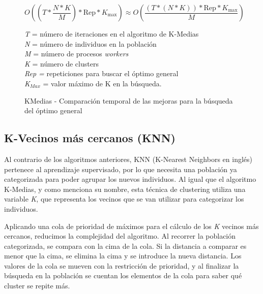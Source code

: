 		\begin{figure} [!h]
			\begin{mdframed}[roundcorner=5pt]
				\[
				O\left((T * \frac{N * K}{M}) * \text{Rep} * K_{\text{max}}\right) \approx O\left(\frac{{(T * (N * K)) * \text{Rep} * K_{\text{max}}}}{{M}}\right)
				\]
				
				
				
				\begin{tcolorbox}[boxrule=0.5pt, fontupper=\small]
					
					\textit{T} = número de iteraciones en el algoritmo de K-Medias\\
					\textit{N} = número de individuos en la población\\
					\textit{M} = número de procesos \textit{workers}\\
					\textit{K} = número de clusters\\
					\textit{Rep = }repeticiones para buscar el óptimo general\\
					\textit{K\(_{Max}\)} = valor máximo de K en la búsqueda.				
					
				\end{tcolorbox}
				
			\end{mdframed}
			\caption{KMedias - Comparación temporal de las mejoras para la búsqueda del óptimo general}
			\label{fig:KMedias_comp}
		\end{figure}
		
		
		
		
	\subsection{K-Vecinos más cercanos (KNN)}
		
		Al contrario de los algoritmos anteriores, KNN (K-Nearest Neighbors en inglés) pertenece al aprendizaje supervisado, por lo que necesita una población ya categorizada para poder agrupar los nuevos individuos. Al igual que el algoritmo K-Medias, y como menciona su nombre, esta técnica de clustering utiliza una variable \textit{K}, que representa los vecinos que se van utilizar para categorizar los individuos.
		
		Aplicando una cola de prioridad de máximos para el cálculo de los \textit{K} vecinos más cercanos, reducimos la complejidad del algoritmo. Al recorrer la población categorizada, se compara con la cima de la cola. Si la distancia a comparar es menor que la cima, se elimina la cima y se introduce la nueva distancia. Los valores de la cola se mueven con la restricción de prioridad, y al finalizar la búsqueda en la población se cuentan los elementos de la cola para saber qué cluster se repite más.
		
